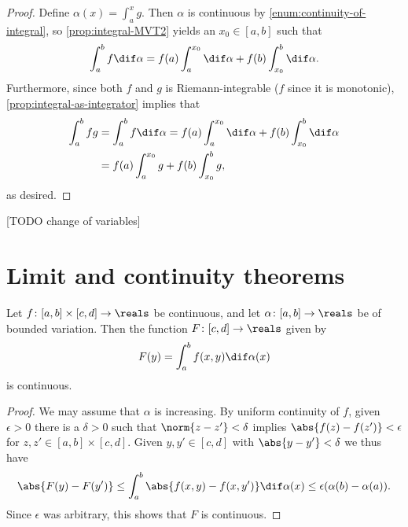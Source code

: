 \documentclass[article, a4paper, 11pt, oneside]{memoir}
\numberwithin{equation}{chapter}
\begin{document}
\begin{proof}
    Define $\alpha(x) = \int_a^x g$. Then $\alpha$ is continuous by \cref{enum:continuity-of-integral}, so \cref{prop:integral-MVT2} yields an $x_0 \in [a,b]$ such that
    \begin{equation*}
        \int_a^b f \dif\alpha
            = f(a) \int_a^{x_0} \dif\alpha + f(b) \int_{x_0}^b \dif\alpha.
    \end{equation*}
    Furthermore, since both $f$ and $g$ is Riemann-integrable ($f$ since it is monotonic), \cref{prop:integral-as-integrator} implies that
    \begin{align*}
        \int_a^b fg
            &= \int_a^b f \dif\alpha
             = f(a) \int_a^{x_0} \dif\alpha + f(b) \int_{x_0}^b \dif\alpha \\
            &= f(a) \int_a^{x_0} g + f(b) \int_{x_0}^b g,
    \end{align*}
    as desired.
\end{proof}

[TODO change of variables]


\section{Limit and continuity theorems}

\begin{proposition}
    \label{thm:integral-continuity}
    Let $f \colon [a,b] \times [c,d] \to \reals$ be continuous, and let $\alpha \colon [a,b] \to \reals$ be of bounded variation. Then the function $F \colon [c,d] \to \reals$ given by
    \begin{equation*}
        F(y)
            = \int_a^b f(x,y) \dif\alpha(x)
    \end{equation*}
    is continuous.
\end{proposition}

\begin{proof}
    We may assume that $\alpha$ is increasing. By uniform continuity of $f$, given $\epsilon > 0$ there is a $\delta > 0$ such that $\norm{z - z'} < \delta$ implies $\abs{f(z) - f(z')} < \epsilon$ for $z,z' \in [a,b] \times [c,d]$. Given $y,y' \in [c,d]$ with $\abs{y - y'} < \delta$ we thus have
    \begin{equation*}
        \abs{F(y) - F(y')}
            \leq \int_a^b \abs{f(x,y) - f(x,y')} \dif\alpha(x)
            \leq \epsilon(\alpha(b) - \alpha(a)).
    \end{equation*}
    Since $\epsilon$ was arbitrary, this shows that $F$ is continuous.
\end{proof}
\end{document}
